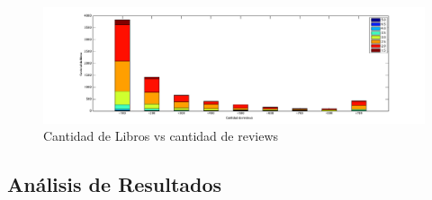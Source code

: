 \documentclass[12pt,journal,compsoc]{IEEEtran}
\begin{document}
\begin{figure}[H]
  \includegraphics[width=8.0in]{imgs/cantLibrosVScantReviews.png}
  \caption{Cantidad de Libros vs cantidad de reviews}
\end{figure}


\subsection{Análisis de Resultados}
\end{document}
